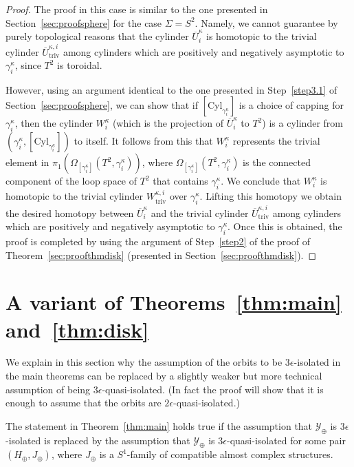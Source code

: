 \documentclass[AHL,Unicode,longabstracts,published]{cedram}
\newcommand{\Cyl}{\mathrm{Cyl}}
\newcommand{\rtriv}{\mathrm{triv}}
\newcommand{\clY}{\mathcal{Y}}
\newenvironment{mainthma}[1]{%
  \renewcommand\themainthmainner{#1}%
  \mainthmainner
}{\endmainthmainner}
\begin{document}
\begin{proof}
The proof in this case is similar to the one presented in Section~\ref{sec:proofsphere} for the case $\Sigma= S^2$. Namely, we cannot guarantee by purely topological reasons that the cylinder $\overline{U}^\kappa_i$ is homotopic to the trivial cylinder $\overline{U}^{\kappa,i}_{\rtriv}$ among cylinders which are positively and negatively asymptotic to $\gamma^\kappa_i$, since $T^2$ is toroidal.

However, using an argument identical to the one presented in Step~\ref{step3.1} of Section~\ref{sec:proofsphere}, we can show that if $[\Cyl_{\gamma^\kappa_i}]$ is a choice of capping for $\gamma^\kappa_i$, then the cylinder ${W}^\kappa_i$ (which is the projection of $\overline{U}^\kappa_i$ to $T^2$) is a cylinder from $(\gamma_i^\kappa,[\Cyl_{\gamma^\kappa_i}])$ to itself. It follows from this that ${W}^\kappa_i$ represents the trivial element in $\pi_1(\Omega_{[\gamma^\kappa_i]}(T^2,\gamma^\kappa_i))$, where $\Omega_{[\gamma^\kappa_i]}(T^2,\gamma^\kappa_i)$ is the connected component of the loop space of $T^2$ that contains $\gamma^\kappa_i$. We conclude that ${W}^\kappa_i$ is homotopic to the trivial cylinder ${W}^{\kappa,i}_{\rtriv}$ over $\gamma^\kappa_i$. Lifting this homotopy we obtain the desired homotopy between $\overline{U}^\kappa_i$ and the trivial cylinder $\overline{U}^{\kappa,i}_{\rtriv}$ among cylinders which are positively and negatively asymptotic to $\gamma^\kappa_i$. Once this is obtained, the proof is completed by using the argument of Step~\ref{step2} of the proof of Theorem~\ref{sec:proofthmdisk} (presented in Section~\ref{sec:proofthmdisk}). 
\end{proof}

\section{A variant of Theorems~\ref{thm:main} and~\ref{thm:disk}}\label{sec:replacing_assumption}

We explain in this section why the assumption of the orbits to be $3\epsilon$-isolated in the main theorems can be replaced by a slightly weaker but more technical assumption of being $3\epsilon$-quasi-isolated. (In fact the proof will show that it is enough to assume that the orbits are $2\epsilon$-quasi-isolated.)

\begin{theo}\label{thm:maina}
The statement in Theorem~\ref{thm:main} holds true if the assumption that $\clY_{\oplus}$ is $3\epsilon$-isolated is replaced by the assumption that $\clY_{\oplus}$ is $3\epsilon$-quasi-isolated for some pair $(H_{\oplus}, J_{\oplus})$, where $J_\oplus$ is a $S^1$-family of compatible almost complex structures.
\end{theo}
\end{document}
